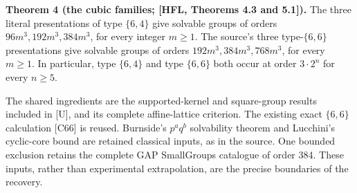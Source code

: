 \textbf{Theorem 4 (the cubic families; {[}HFL, Theorems 4.3 and 5.1{]}).} The
three literal presentations of type \(\{6,4\}\) give solvable groups of
orders \(96m^3,192m^3,384m^3\), for every integer \(m\geq1\). The source's
three type-\(\{6,6\}\) presentations give solvable groups of orders
\(192m^3,384m^3,768m^3\), for every \(m\geq1\). In particular, type
\(\{6,4\}\) and type \(\{6,6\}\) both occur at order \(3\cdot2^n\)
for every \(n\geq5\).

The shared ingredients are the supported-kernel and square-group
results included in [U], and its complete affine-lattice criterion.
The existing exact \(\{6,6\}\) calculation {[}C66{]} is reused. Burnside's
\(p^a q^b\) solvability theorem and Lucchini's cyclic-core bound are
retained classical inputs, as in the source. One bounded exclusion
retains the complete GAP SmallGroups catalogue of order 384. These
inputs, rather than experimental extrapolation, are the precise
boundaries of the recovery.
